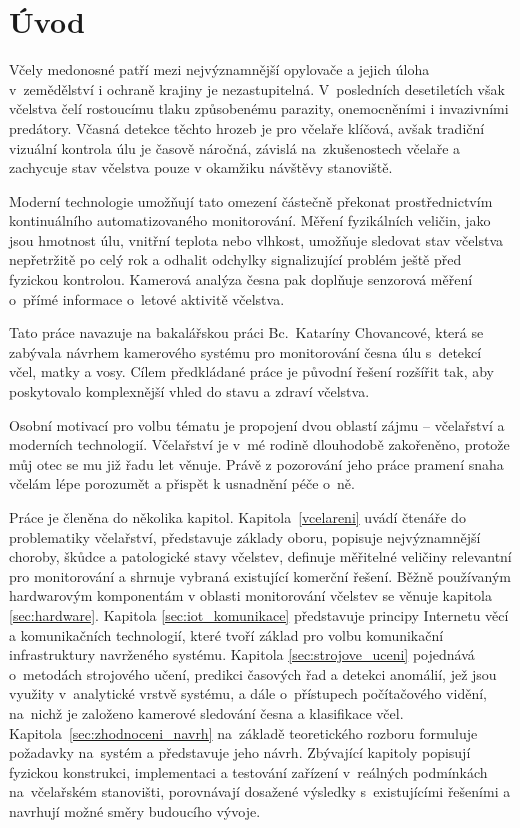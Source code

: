 \chapter{Úvod}
Včely medonosné patří mezi nejvýznamnější opylovače a jejich úloha v~zemědělství i ochraně krajiny je nezastupitelná. V~posledních desetiletích však včelstva čelí rostoucímu tlaku způsobenému parazity, onemocněními i invazivními predátory. Včasná detekce těchto hrozeb je pro včelaře klíčová, avšak tradiční vizuální kontrola úlu je časově náročná, závislá na~zkušenostech včelaře a zachycuje stav včelstva pouze v okamžiku návštěvy stanoviště.

Moderní technologie umožňují tato omezení částečně překonat prostřednictvím kontinuálního automatizovaného monitorování. Měření fyzikálních veličin, jako jsou hmotnost úlu, vnitřní teplota nebo vlhkost, umožňuje sledovat stav včelstva nepřetržitě po celý rok a odhalit odchylky signalizující problém ještě před fyzickou kontrolou. Kamerová analýza česna pak doplňuje senzorová měření o~přímé informace o~letové aktivitě včelstva.

Tato práce navazuje na bakalářskou práci Bc.~Kataríny Chovancové, která se zabývala návrhem kamerového systému pro monitorování česna úlu s~detekcí včel, matky a vosy. Cílem předkládané práce je původní řešení rozšířit tak, aby poskytovalo komplexnější vhled do stavu a zdraví včelstva.

Osobní motivací pro volbu tématu je propojení dvou oblastí zájmu -- včelařství a moderních technologií. Včelařství je v~mé rodině dlouhodobě zakořeněno, protože můj otec se mu již řadu let věnuje. Právě z pozorování jeho práce pramení snaha včelám lépe porozumět a přispět k usnadnění péče o~ně.

Práce je členěna do několika kapitol. Kapitola~\ref{vcelareni} uvádí čtenáře do problematiky včelařství, představuje základy oboru, popisuje nejvýznamnější choroby, škůdce a patologické stavy včelstev, definuje měřitelné veličiny relevantní pro monitorování a shrnuje vybraná existující komerční řešení. Běžně používaným hardwarovým komponentám v oblasti monitorování včelstev se věnuje kapitola \ref{sec:hardware}. Kapitola \ref{sec:iot_komunikace} představuje principy Internetu věcí a komunikačních technologií, které tvoří základ pro volbu komunikační infrastruktury navrženého systému. Kapitola \ref{sec:strojove_uceni} pojednává o~metodách strojového učení, predikci časových řad a detekci anomálií, jež jsou využity v~analytické vrstvě systému, a dále o~přístupech počítačového vidění, na~nichž je založeno kamerové sledování česna a klasifikace včel. Kapitola~\ref{sec:zhodnoceni_navrh} na~základě teoretického rozboru formuluje požadavky na~systém a představuje jeho návrh. Zbývající kapitoly popisují fyzickou konstrukci, implementaci a testování zařízení v~reálných podmínkách na~včelařském stanovišti, porovnávají dosažené výsledky s~existujícími řešeními a navrhují možné směry budoucího vývoje.

